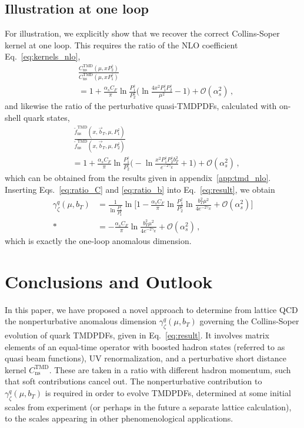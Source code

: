 \documentclass[prd,aps,twocolumn,bibnotes,nofootinbib,preprintnumbers,floatfix]{revtex4-1}
\DeclareRobustCommand{\eq}[1]{Eq.~\eqref{eq:#1}}
\DeclareRobustCommand{\eqs}[2]{Eqs.~\eqref{eq:#1} and \eqref{eq:#2}}
\DeclareRobustCommand{\app}[1]{appendix~\ref{app:#1}}
\newcommand{\cO}{\mathcal{O}}
\newcommand{\nn}{\nonumber}
\newcommand{\as}{\alpha_s}
\newcommand{\bt}{\vec b_T}
\newcommand{\ns}{{\text{ns}}}
\newcommand\TMD{\mathrm{TMD}}
\begin{document}
\subsection{Illustration at one loop}


For illustration, we explicitly show that we recover the correct Collins-Soper kernel at one loop.
This requires the ratio of the NLO coefficient \eq{kernels_nlo},
\begin{align} \label{eq:ratio_C}
&\frac{C^\TMD_\ns(\mu,x P_2^z)}{C^\TMD_\ns(\mu,x P_1^z)}
\\\nn&
 = 1 + \frac{\as C_F}{\pi} \ln\frac{P^z_1}{P^z_2} \biggl( \ln\frac{4 x^2 P^z_1 P^z_2}{\mu^2} - 1 \biggr) + \cO(\as^2)
\,,\end{align}
and likewise the ratio of the perturbative quasi-TMDPDFs, calculated with on-shell quark states,
\begin{align} \label{eq:ratio_b}
&~\frac{\tilde f^\TMD_\ns(x, \bt, \mu, P^z_1)}{\tilde f^\TMD_\ns(x, \bt, \mu, P^z_2)}
\\\nn&
 = 1 + \frac{\as C_F}{\pi} \ln\frac{P^z_1}{P^z_2}
   \biggl( -\ln\frac{x^2 P^z_1 P^z_2 b_T^2}{e^{-2\gamma_E}} + 1 \biggr)
   + \cO(\as^2)
\,,\end{align}
which can be obtained from the results given in \app{tmd_nlo}.
Inserting \eqs{ratio_C}{ratio_b} into \eq{result}, we obtain
\begin{align} \label{eq:result_nlo}
 \gamma^q_\zeta(\mu, b_T) &
 = \frac{1}{\ln\frac{P^z_1}{P^z_2}} \ln\biggl[1\! - \frac{\as C_F}{\pi} \ln\frac{P^z_1}{P^z_2} \ln\frac{b_T^2 \mu^2}{4 e^{-2\gamma_E}}
 +\! \cO(\as^2) \biggr]
\nn\\*&
 = - \frac{\as C_F}{\pi} \ln\frac{b_T^2 \mu^2}{4 e^{-2\gamma_E}} + \cO(\as^2)
\,,\end{align}
which is exactly the one-loop anomalous dimension.


\section{Conclusions and Outlook}
\label{sec:conclusions}

In this paper, we have proposed a novel approach to determine  from lattice QCD the nonperturbative anomalous dimension $\gamma^q_\zeta(\mu,b_T)$ governing the Collins-Soper evolution of quark TMDPDFs, given in \eq{result}.
It involves matrix elements of an equal-time operator with boosted hadron states (referred to as quasi beam functions), UV renormalization, and a perturbative short distance kernel $C_\ns^\TMD$. These are taken in a ratio with different hadron momentum, such that soft contributions cancel out.
The nonperturbative contribution to $\gamma^q_\zeta(\mu,b_T)$ is required in order to evolve TMDPDFs, determined at some initial scales from experiment (or perhaps in the future a separate lattice calculation), to the scales appearing in other phenomenological applications.
\end{document}

